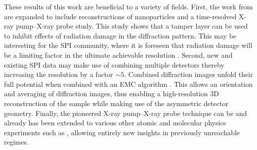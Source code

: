 %
These results of this work are beneficial to a variety of fields. First, the work from \citep{Hoener-2008-JPB,Gorkhover-2016-NatPho} are expanded to include reconstructions of nanoparticles and a time-resolved X-ray pump--X-ray probe study. This study shows that a tamper layer can be used to inhibit effects of radiation damage in the diffraction pattern. This may be interesting for the SPI community, where it is foreseen that radiation damage will be a limiting factor in the ultimate achievable resolution \citep{Aquila-2015-StrucDyn}. Second, new and existing SPI data may make use of combining multiple detectors thereby increasing the resolution by a factor $\sim 5$. Combined diffraction images unfold their full potential when combined with an EMC algorithm \citep{Loh-2009-PRE}. This allows an orientation and averaging of diffraction images, thus enabling a high-resolution 3D reconstruction of the sample while making use of the asymmetric detector geometry. Finally, the pioneered X-ray pump--X-ray probe technique can be and already has been extended to various other atomic and molecular physics experiments such as \citep{Picon-2016-NatComm,Lehmann-2016-PRA,Kimberg-2016-FD,Al-Haddad-2017-unpublished,Ferguson-2016-SciAdv}, allowing entirely new insights in previously unreachable regimes.
%
%
%